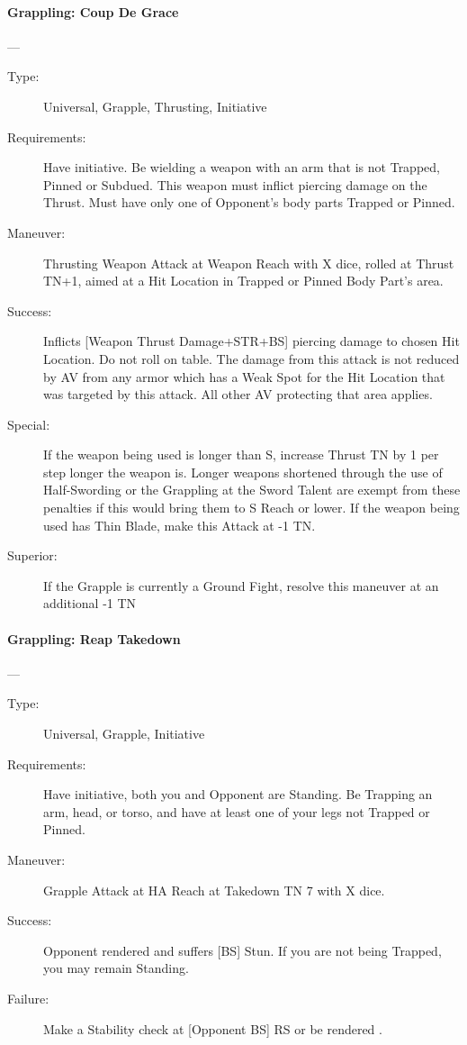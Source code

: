 \paragraph{Grappling: Coup De Grace \large} \label{man:grappling-coup-de-grace}
---\quad {\large [X+2]}
\vspace{-10pt} \begin{description}
\item [Type:] Universal, Grapple, Thrusting, Initiative
\item [Requirements:] Have initiative. Be wielding a weapon with an arm that is
  not Trapped, Pinned or Subdued. This weapon must inflict piercing damage on
  the Thrust. Must have only one of Opponent’s body parts Trapped or Pinned.  
\item [Maneuver:] Thrusting Weapon Attack at Weapon Reach with X dice, rolled at
  Thrust TN+1, aimed at a Hit Location in Trapped or Pinned Body Part’s area. 
\item [Success:] Inflicts [Weapon Thrust Damage+STR+BS] piercing damage to
  chosen Hit Location. Do not roll on table. The damage from this attack is not
  reduced by AV from any armor which has a Weak Spot for the Hit Location that
  was targeted by this attack. All other AV protecting that area applies. 
\item [Special:] If the weapon being used is longer than S, increase Thrust TN
  by 1 per step longer the weapon is. Longer weapons shortened through the use
  of Half-Swording or the Grappling at the Sword Talent are exempt from these
  penalties if this would bring them to S Reach or lower. If the weapon being
  used has Thin Blade, make this Attack at -1 TN.  
\item [ Superior: ] If the Grapple is currently a Ground Fight, resolve this
  maneuver at an additional -1 TN 
\end{description}

\paragraph{Grappling: Reap Takedown \large} \label{man:grappling-reap-takedown}
---\quad {\large [X]}
\vspace{-10pt} \begin{description}
\item [Type:] Universal, Grapple, Initiative
\item [Requirements:] Have initiative, both you and Opponent are Standing. Be Trapping
an arm, head, or torso, and have at least one of your legs not Trapped or
Pinned. 
\item [Maneuver:] Grapple Attack at HA Reach at Takedown TN 7 with X dice.
\item [Success:] Opponent rendered  and suffers [BS] Stun. If you are not
  being Trapped, you may remain Standing. 
\item [Failure:] Make a Stability check at [Opponent BS] RS or be rendered .  
\end{description}

